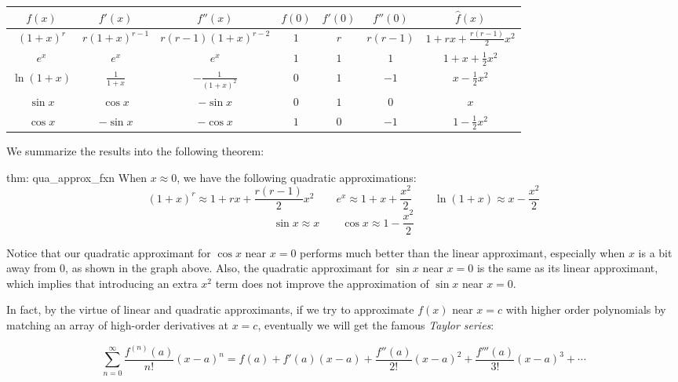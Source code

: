 \begin{table}[ht]
    \centering
    \begin{tabular}{ccccccc}
        $f(x)$ & $f'(x)$ & $f''(x)$ & $f(0)$ & $f'(0)$ & $f''(0)$ &$\hat{f}(x)$\\
        \hline
        $(1+x)^r$ & $r(1+x)^{r-1}$ & $r(r-1)(1+x)^{r-2}$ & $1$ & $r$ & $r(r-1)$ & $1+rx+\frac{r(r-1)}{2}x^2$ \\
        $e^x$ & $e^x$ & $e^x$ & $1$ & $1$ & $1$ & $1+x+\frac{1}{2}x^2$ \\
        $\ln(1+x)$ & $\frac{1}{1+x}$ & $-\frac{1}{(1+x)^2}$ & $0$ & $1$ & $-1$ & $x-\frac{1}{2}x^2$ \\
        $\sin x$ & $\cos x$ & $-\sin x$ & $0$ & $1$ & $0$ & $x$\\
        $\cos x$ & $-\sin x$ & $-\cos x$ & $1$ & $0$ &$-1$ & $1-\frac{1}{2}x^2$
    \end{tabular}
    \label{tab: qua_approx_deriv}
\end{table}

We summarize the results into the following theorem:

\begin{theo}{thm: qua_approx_fxn}
    When $x \approx 0$, we have the following quadratic approximations:
    \[(1+x)^r \approx 1+rx+\frac{r(r-1)}{2}x^2 \qquad e^x \approx 1+x+\frac{x^2}{2} \qquad \ln(1+x) \approx x-\frac{x^2}{2}\]
    \[\sin x \approx x \qquad \cos x \approx 1-\frac{x^2}{2} \]
\end{theo}

\begin{remark}
    Notice that our quadratic approximant for $\cos x$ near $x=0$ performs much better than the linear approximant, especially when $x$ is a bit away from $0$, as shown in the graph above.  Also, the quadratic approximant for $\sin x$ near $x=0$ is the same as its linear approximant, which implies that introducing an extra $x^2$ term does not improve the approximation of $\sin x$ near $x=0$.
\end{remark}

In fact, by the virtue of linear and quadratic approximants, if we try to approximate $f(x)$ near $x=c$ with higher order polynomials by matching an array of high-order derivatives at $x=c$, eventually we will get the famous \textit{Taylor series}:

\[\sum_{n=0}^\infty\frac{f^{(n)}(a)}{n!}(x-a)^n = f(a) + f'(a)(x-a) + \frac{f''(a)}{2!}(x-a)^2 + \frac{f'''(a)}{3!}(x-a)^3 + \cdots\]

